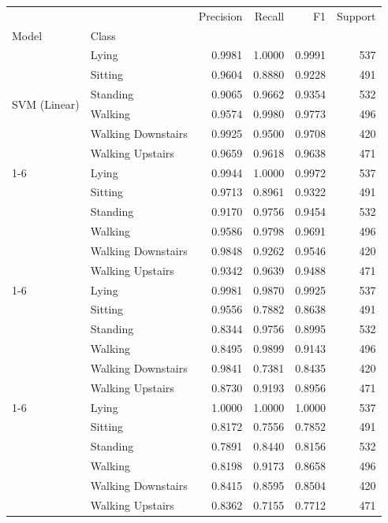 \begin{table}
\label{tab:Ext13_per_class_results}
\begin{tabular}{llrrrr}
\toprule
 &  & Precision & Recall & F1 & Support \\
Model & Class &  &  &  &  \\
\midrule
\multirow[t]{6}{*}{SVM (Linear)} & Lying & 0.9981 & 1.0000 & 0.9991 & 537 \\
 & Sitting & 0.9604 & 0.8880 & 0.9228 & 491 \\
 & Standing & 0.9065 & 0.9662 & 0.9354 & 532 \\
 & Walking & 0.9574 & 0.9980 & 0.9773 & 496 \\
 & Walking Downstairs & 0.9925 & 0.9500 & 0.9708 & 420 \\
 & Walking Upstairs & 0.9659 & 0.9618 & 0.9638 & 471 \\
\cline{1-6}
\multirow[t]{6}{*}{SVM (RBF)} & Lying & 0.9944 & 1.0000 & 0.9972 & 537 \\
 & Sitting & 0.9713 & 0.8961 & 0.9322 & 491 \\
 & Standing & 0.9170 & 0.9756 & 0.9454 & 532 \\
 & Walking & 0.9586 & 0.9798 & 0.9691 & 496 \\
 & Walking Downstairs & 0.9848 & 0.9262 & 0.9546 & 420 \\
 & Walking Upstairs & 0.9342 & 0.9639 & 0.9488 & 471 \\
\cline{1-6}
\multirow[t]{6}{*}{KNN} & Lying & 0.9981 & 0.9870 & 0.9925 & 537 \\
 & Sitting & 0.9556 & 0.7882 & 0.8638 & 491 \\
 & Standing & 0.8344 & 0.9756 & 0.8995 & 532 \\
 & Walking & 0.8495 & 0.9899 & 0.9143 & 496 \\
 & Walking Downstairs & 0.9841 & 0.7381 & 0.8435 & 420 \\
 & Walking Upstairs & 0.8730 & 0.9193 & 0.8956 & 471 \\
\cline{1-6}
\multirow[t]{6}{*}{Decision Tree} & Lying & 1.0000 & 1.0000 & 1.0000 & 537 \\
 & Sitting & 0.8172 & 0.7556 & 0.7852 & 491 \\
 & Standing & 0.7891 & 0.8440 & 0.8156 & 532 \\
 & Walking & 0.8198 & 0.9173 & 0.8658 & 496 \\
 & Walking Downstairs & 0.8415 & 0.8595 & 0.8504 & 420 \\
 & Walking Upstairs & 0.8362 & 0.7155 & 0.7712 & 471 \\

\end{tabular}
\end{table}

